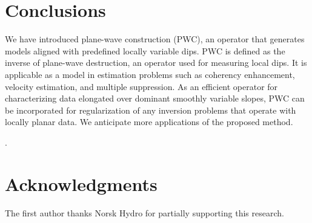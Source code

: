 \begin{comment}
The least-squares inversion regularized by shaping takes the form
\cite[]{shape}
\begin{equation}
  \label{eq:shape}
  \widehat{\mathbf{m}} = 
  \mathbf{B}_k\,\left[\epsilon^2\,\mathbf{I}_N + 
    \mathbf{B}_k^T\,\left(\mathbf{L}^T\,\mathbf{L} - 
      \epsilon^2\,\mathbf{I}_N\right)\,
    \mathbf{B}_k\right]^{-1}\,
  \mathbf{B}_k^T\,\mathbf{L}^T\,\,\mathbf{d}\;.
\end{equation}

Figure~\ref{fig:bei-smo} shows several impulse responses for shaping with
$k=20$ for the seismic image used in this study.


\end{comment}

\section{Conclusions}

We have introduced plane-wave construction (PWC), an operator that
generates models aligned with predefined locally variable dips. PWC is
defined as the inverse of plane-wave destruction, an operator used for
measuring local dips.  It is applicable as a model
  in 
 estimation problems such as coherency enhancement,
 velocity estimation, and multiple suppression. As an
efficient operator for characterizing data elongated over dominant
smoothly variable slopes, PWC can be incorporated for regularization
of any inversion problems that operate with locally planar data. We
anticipate more applications of the proposed method.

.

\section{Acknowledgments}

The first author thanks Norsk Hydro for partially supporting this
research. 




